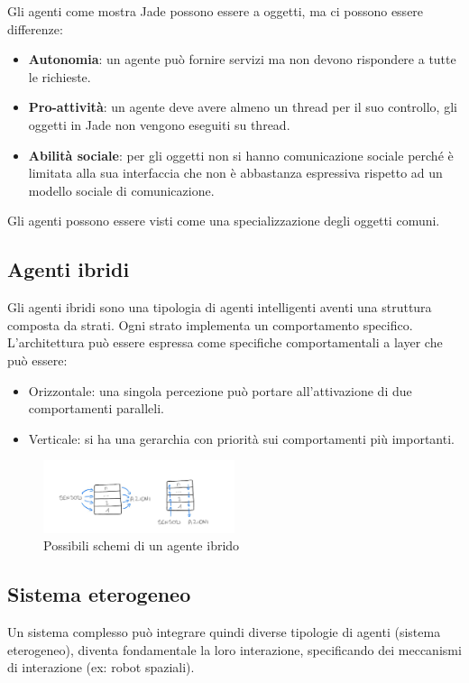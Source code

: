 Gli agenti come mostra Jade possono essere a oggetti, ma ci possono essere differenze:
\begin{itemize}
    \item \textbf{Autonomia}: un agente può fornire servizi ma non devono
          rispondere a tutte le richieste.
    \item \textbf{Pro-attività}: un agente deve avere almeno un thread per il
          suo controllo, gli oggetti in Jade non vengono eseguiti su thread.
    \item \textbf{Abilità sociale}: per gli oggetti non si hanno comunicazione
          sociale perché è limitata alla sua interfaccia che non è abbastanza
          espressiva rispetto ad un modello sociale di comunicazione.
\end{itemize}
Gli agenti possono essere visti come una specializzazione degli oggetti comuni.
\subsection{Agenti ibridi}
Gli agenti ibridi sono una tipologia di agenti intelligenti aventi una struttura
composta da strati. Ogni strato implementa un comportamento specifico.
L'architettura può essere espressa come specifiche comportamentali a layer che
può essere:
\begin{itemize}
    \item Orizzontale: una singola percezione può portare all'attivazione di due
          comportamenti paralleli.
    \item Verticale: si ha una gerarchia con priorità sui comportamenti più
          importanti.
\end{itemize}
\begin{figure}[!h]
    \centering
    \includegraphics[width=0.50\textwidth]{./img/Agenti/agente_ibrido.jpg}
    \caption{Possibili schemi di un agente ibrido}
    \label{fig:Agente_ibrido}
\end{figure}
\subsection{Sistema eterogeneo}
Un sistema complesso può integrare quindi diverse tipologie di agenti
(sistema eterogeneo), diventa fondamentale la loro interazione, specificando dei
meccanismi di interazione (ex: robot spaziali).

